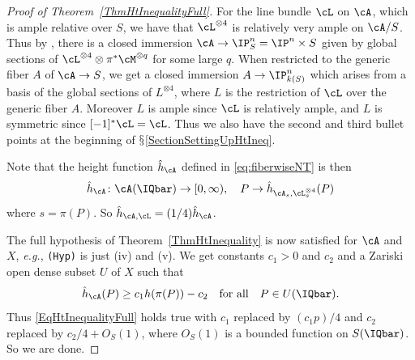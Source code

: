 \begin{proof}[Proof of Theorem~\ref{ThmHtInequalityFull}]
For the line bundle $\cL$ on $\cA$, which is ample relative over $S$, we have that $\cL^{\otimes 4}$ is relatively very ample on $\cA/S$. Thus by  \cite[Proposition~4.4.10.(ii) and Proposition~4.1.4]{EGAII}, there is a closed immersion $\cA \rightarrow \IP^n_S = \IP^n \times S$ given by global sections of $\cL^{\otimes 4} \otimes \pi^*\cM^{\otimes q}$ for some large $q$. When restricted to the generic fiber $A$ of $\cA \rightarrow S$, we get a closed immersion $A \rightarrow \IP^n_{k(S)}$ which arises from a basis of the global sections of $L^{\otimes 4}$, where $L$ is the restriction of $\cL$ over the generic fiber $A$. Moreover $L$ is ample since $\cL$ is relatively ample, and $L$ is symmetric since $[-1]^*\cL = \cL$. Thus we also have the second and third bullet points at the beginning of $\mathsection$\ref{SectionSettingUpHtIneq}.

Note that the height function $\hat{h}_{\cA}$ defined in \eqref{eq:fiberwiseNT} is then
\[
\hat{h}_{\cA} \colon \cA(\IQbar) \rightarrow [0,\infty), \quad P \rightarrow \hat{h}_{\cA_s,\cL_s^{\otimes 4}}(P)
\]
where $s = \pi(P)$. So $\hat{h}_{\cA,\cL} = (1/4)\hat{h}_{\cA}$.


The full
hypothesis of Theorem~\ref{ThmHtInequality}  is now satisfied for $\cA$
and $X$,
\textit{e.g.}, \texttt{(Hyp)} is just (iv) and (v).
We get constants $c_1> 0$ and $c_2$ and a Zariski open dense subset $U$ of $X$ such that
\[
    \hat{h}_{\cA}(P) \ge c_1 h( \pi(P) ) - c_2 \quad \text{for all}\quad P \in U(\IQbar).
\]
Thus \eqref{EqHtInequalityFull} holds true with $c_1$ replaced by $(c_1p)/4$ and $c_2$ replaced by $c_2/4 + O_S(1)$, where $O_S(1)$ is a bounded function on $S(\IQbar)$. So we are done.
\end{proof}









%

%


\vfill




